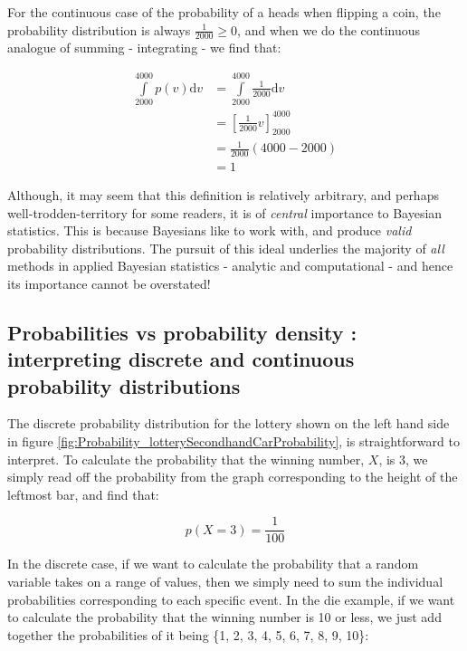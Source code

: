 \documentclass[11pt,fullpage]{book}
\begin{document}
For the continuous case of the probability of a heads when flipping a coin, the probability distribution is always $\frac{1}{2000}\geq 0$, and when we do the continuous analogue of summing - integrating - we find that:

\begin{equation}
\begin{align}
\int\limits_{2000}^{4000} p(v) \mathrm{d}v &= \int\limits_{2000}^{4000} \frac{1}{2000} \mathrm{d}v\\
&= \left[\frac{1}{2000}v\right]^{4000}_{2000}\\
&= \frac{1}{2000}\left(4000-2000\right)\\
&= 1
\end{align}
\end{equation}

Although, it may seem that this definition is relatively arbitrary, and perhaps well-trodden-territory for some readers, it is of \textit{central} importance to Bayesian statistics. This is because Bayesians like to work with, and produce \textit{valid} probability distributions. The pursuit of this ideal underlies the majority of \textit{all} methods in applied Bayesian statistics - analytic and computational - and hence its importance cannot be overstated!

\subsection{Probabilities vs probability density : interpreting discrete and continuous probability distributions}\label{sec:Probability_densityVsMassFunctions}
The discrete probability distribution for the lottery shown on the left hand side in figure \ref{fig:Probability_lotterySecondhandCarProbability}, is straightforward to interpret. To calculate the probability that the winning number, $X$, is 3, we simply read off the probability from the graph corresponding to the height of the leftmost bar, and find that:

\begin{equation}
p(X=3)= \frac{1}{100}
\end{equation}

In the discrete case, if we want to calculate the probability that a random variable takes on a range of values, then we simply need to sum the individual probabilities corresponding to each specific event. In the die example, if we want to calculate the probability that the winning number is 10 or less, we just add together the probabilities of it being \{1, 2, 3, 4, 5, 6, 7, 8, 9, 10\}:
\end{document}
